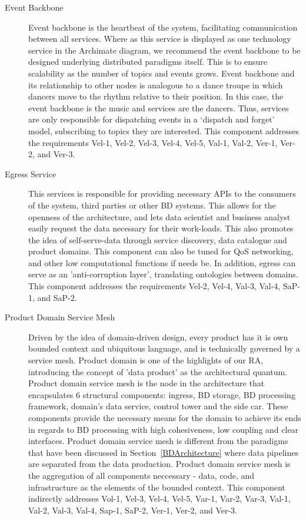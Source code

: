 \documentclass[a4paper,11pt]{article}
\begin{document}
\begin{description}
    \item[Event Backbone] Event backbone is the heartbeat of the system, facilitating communication between all services. Where as this service is displayed as one technology service in the Archimate diagram, we recommend the event backbone to be designed underlying distributed paradigms itself. This is to ensure scalability as the number of topics and events grows. Event backbone and its relationship to other nodes is analogous to a dance troupe in which dancers move to the rhythm relative to their position. In this case, the event backbone is the music and services are the dancers. Thus, services are only responsible for dispatching events in a `dispatch and forget' model, subscribing to topics they are interested. This component addresses the requirements Vel-1, Vel-2, Vel-3, Vel-4, Vel-5, Val-1, Val-2, Ver-1, Ver-2, and Ver-3.
    
    \item[Egress Service] This services is responsible for providing necessary APIs to the consumers of the system, third parties or other BD systems. This allows for the openness of the architecture, and lets data scientist and business analyst easily request the data necessary for their work-loads. This also promotes the idea of self-serve-data through service discovery, data catalogue and product domains. This component can also be tuned for QoS networking, and other low computational functions if needs be. In addition, egress can serve as an 'anti-corruption layer', translating ontologies between domains. This component addresses the requirements Vel-2, Vel-4, Val-3, Val-4, SaP-1, and SaP-2. 
    
    \item[Product Domain Service Mesh] Driven by the idea of domain-driven design, every product has it is own bounded context and ubiquitous language, and is technically governed by a service mesh. Product domain is one of the highlights of our RA, introducing the concept of 'data product' as the architectural quantum. Product domain service mesh is the node in the architecture that encapsulates 6 structural components: ingress, BD storage, BD processing framework, domain's data service, control tower and the side car. These components provide the necessary means for the domain to achieve its ends in regards to BD processing with high cohesiveness, low coupling and clear interfaces. Product domain service mesh is different from the paradigms that have been discussed in Section~\ref{BDArchitecture} where data pipelines are separated from the data production. Product domain service mesh is the aggregation of all components neccessary - data, code, and infrastructure as the elements of the bounded context. This component indirectly addresses Vol-1, Vel-3, Vel-4, Vel-5, Var-1, Var-2, Var-3, Val-1, Val-2, Val-3, Val-4, Sap-1, SaP-2, Ver-1, Ver-2, and Ver-3.
    

\end{description}
\end{document}
